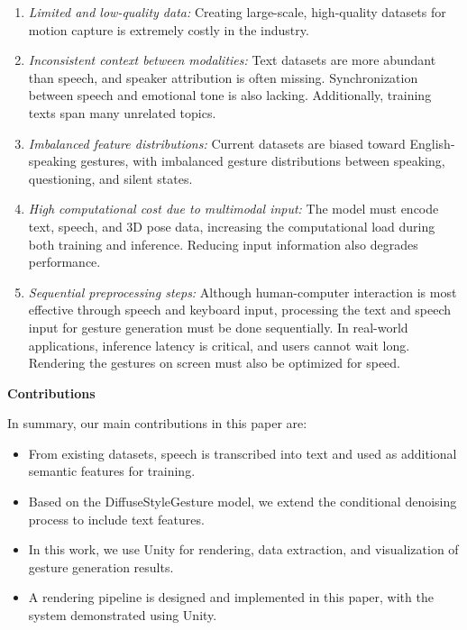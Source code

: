 \begin{enumerate}
	\item \textit{Limited and low-quality data:} Creating large-scale, high-quality datasets for motion capture is extremely costly in the industry.
	
	\item \textit{Inconsistent context between modalities:} Text datasets are more abundant than speech, and speaker attribution is often missing. Synchronization between speech and emotional tone is also lacking. Additionally, training texts span many unrelated topics.
	
	\item \textit{Imbalanced feature distributions:} Current datasets are biased toward English-speaking gestures, with imbalanced gesture distributions between speaking, questioning, and silent states.
	
	\item \textit{High computational cost due to multimodal input:} The model must encode text, speech, and 3D pose data, increasing the computational load during both training and inference. Reducing input information also degrades performance.
	
	\item \textit{Sequential preprocessing steps:} Although human-computer interaction is most effective through speech and keyboard input, processing the text and speech input for gesture generation must be done sequentially. In real-world applications, inference latency is critical, and users cannot wait long. Rendering the gestures on screen must also be optimized for speed.
\end{enumerate}

\large \textbf{Contributions}

 In summary, our main contributions in this paper are:
 
\begin{itemize}
	\item From existing datasets, speech is transcribed into text and used as additional semantic features for training.
	
	\item Based on the DiffuseStyleGesture model, we extend the conditional denoising process to include text features.
	
	\item In this work, we use Unity for rendering, data extraction, and visualization of gesture generation results.
	
	\item A rendering pipeline is designed and implemented in this paper, with the system demonstrated using Unity.
\end{itemize}

